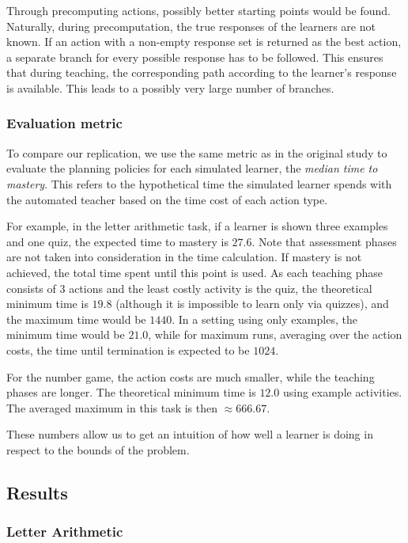 Through precomputing actions, possibly better starting points would be found. Naturally, during precomputation, the true responses of the learners are not known.
If an action with a non-empty response set is returned as the best action, a separate branch for every possible response has to be followed.
This ensures that during teaching, the corresponding path according to the learner's response is available.
This leads to a possibly very large number of branches.

\subsubsection{Evaluation metric}

To compare our replication, we use the same metric as in the original study to evaluate the planning policies for each simulated learner, the \textit{median time to mastery}.
This refers to the hypothetical time the simulated learner spends with the automated teacher based on the time cost of each action type.

For example, in the letter arithmetic task, if a learner is shown three examples and one quiz, the expected time to mastery is $27.6$. 
Note that assessment phases are not taken into consideration in the time calculation.
If mastery is not achieved, the total time spent until this point is used. 
As each teaching phase consists of 3 actions and the least costly activity is the quiz, the theoretical minimum time is $19.8$ (although it is impossible to learn only via quizzes), and the maximum time would be $1440$. 
In a setting using only examples, the minimum time would be $21.0$, while for maximum runs, averaging over the action costs, the time until termination is expected to be $1024$.


For the number game, the action costs are much smaller, while the teaching phases are longer.
The theoretical minimum time is $12.0$ using example activities.
The averaged maximum in this task is then $\approx 666.67$.

These numbers allow us to get an intuition of how well a learner is doing in respect to the bounds of the problem.

\subsection{Results}

\subsubsection{Letter Arithmetic}

